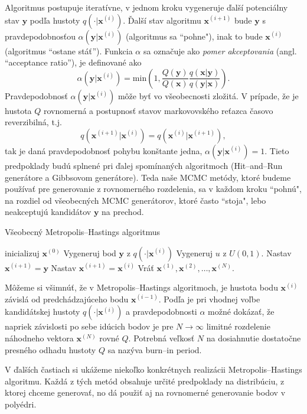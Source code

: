 Algoritmus postupuje iteratívne, v jednom kroku vygeneruje ďalší potenciálny stav $\mathbf y$ podľa hustoty $q(\cdot |\mathbf x^{(i)})$. Ďalší stav algoritmu $\mathbf x^{(i+1)}$ bude $\mathbf y$ s pravdepodobnosťou $\alpha (\mathbf y|\mathbf x^{(i)})$ (algoritmus sa ``pohne"), inak to bude $\mathbf x^{(i)}$ (algoritmus ``ostane stáť''). Funkcia $\alpha$ sa označuje ako \textit{pomer akceptovania} (angl. ``acceptance ratio''), je definované ako $$\alpha (\mathbf y|\mathbf x^{(i)}) = \text{min}\left( 1, \frac{Q(\mathbf y)}{Q(\mathbf x)} \frac {q(\mathbf x|\mathbf y)}{q(\mathbf y | \mathbf x)} \right).$$ 
Pravdepodobnosť $\alpha (\mathbf y|\mathbf x^{(i)})$ môže byť vo všeobecnosti zložitá. V prípade, že je hustota $Q$ rovnomerná a postupnosť stavov markovovského reťazca časovo reverzibilná, t.j. $$q(\mathbf x^{(i+1)}|\mathbf x^{(i)})=q(\mathbf x^{(i)}|\mathbf x^{(i+1)}),$$ tak je daná pravdepodobnosť pohybu konštante jedna, $\alpha (\mathbf y|\mathbf x^{(i)})=1$. Tieto predpoklady budú splnené pri ďalej spomínaných algoritmoch (Hit--and--Run generátore a Gibbsovom generátore). Teda naše MCMC metódy, ktoré budeme používať pre generovanie z rovnomerného rozdelenia, sa v každom kroku ``pohnú", na rozdiel od všeobecných MCMC generátorov, ktoré často ``stoja", lebo neakceptujú kandidátov $\mathbf y$ na prechod.

\begin{algorithm}[H]
	\caption{Všeobecný Metropolis--Hastings algoritmus \cite{metropolis-hastings_chib}}
	\label{metropolis-hastings}
	\begin{algorithmic}[1]
		\State inicializuj $\mathbf x^{(0)}$
			\State Vygeneruj bod $\mathbf y$ z $q(\cdot|\mathbf x^{(i)})$
			\State Vygeneruj $u$ z $U(0,1)$.
				\State Nastav $\mathbf x^{(i+1)}=\mathbf y$
			\Else
				\State Nastav $\mathbf x^{(i+1)}=\mathbf x^{(i)}$
			\EndIf
		\EndFor
		\State Vráť ${\mathbf x^{(1)},\mathbf x^{(2)},\dots,\mathbf x^{(N)}}$.
	\end{algorithmic}
\end{algorithm}

Môžeme si všimnúť, že v Metropolis--Hastings algoritmoch, je hustota bodu $\mathbf x^{(i)}$ závislá od predchádzajúceho bodu $\mathbf x^{(i-1)}$. Podľa \cite{metropolis-hastings_chib} je pri vhodnej voľbe kandidátskej hustoty $q(\cdot|\mathbf x^{(i)})$ a pravdepodobnosti $\alpha$ možné dokázať, že napriek závislosti po sebe idúcich bodov je pre $N \rightarrow \infty$ limitné rozdelenie náhodneho vektora $\mathbf x^{(N)}$ rovné $Q$. Potrebná veľkosť $N$ na dosiahnutie dostatočne presného odhadu hustoty $Q$ sa nazýva burn--in period.

V ďalších častiach si ukážeme niekoľko konkrétnych realizácii Metropolis--Hastings algoritmu. Každá z tých metód obsahuje určité predpoklady na distribúciu, z ktorej chceme generovať, no dá použiť aj na rovnomerné generovanie bodov v polyédri.